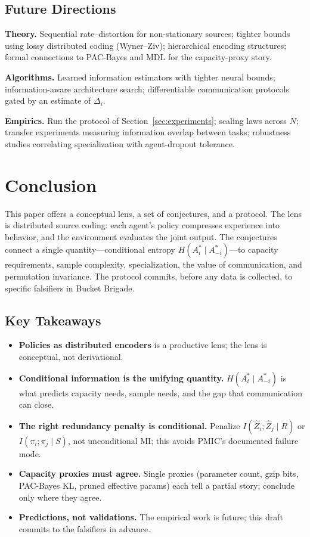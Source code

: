 \documentclass[10pt, letterpaper]{article}
\begin{document}
\subsection{Future Directions}

\textbf{Theory.} Sequential rate--distortion for non-stationary sources; tighter bounds using lossy distributed coding (Wyner--Ziv); hierarchical encoding structures; formal connections to PAC-Bayes and MDL for the capacity-proxy story.

\textbf{Algorithms.} Learned information estimators with tighter neural bounds; information-aware architecture search; differentiable communication protocols gated by an estimate of $\Delta_i$.

\textbf{Empirics.} Run the protocol of Section~\ref{sec:experiments}; scaling laws across $N$; transfer experiments measuring information overlap between tasks; robustness studies correlating specialization with agent-dropout tolerance.

\section{Conclusion}
\label{sec:conclusion}

This paper offers a conceptual lens, a set of conjectures, and a protocol. The lens is distributed source coding: each agent's policy compresses experience into behavior, and the environment evaluates the joint output. The conjectures connect a single quantity---conditional entropy $H(A_i^*\mid A_{-i}^*)$---to capacity requirements, sample complexity, specialization, the value of communication, and permutation invariance. The protocol commits, before any data is collected, to specific falsifiers in Bucket Brigade.

\subsection*{Key Takeaways}
\begin{itemize}
    \item \textbf{Policies as distributed encoders} is a productive lens; the lens is conceptual, not derivational.
    \item \textbf{Conditional information is the unifying quantity.} $H(A_i^*\mid A_{-i}^*)$ is what predicts capacity needs, sample needs, and the gap that communication can close.
    \item \textbf{The right redundancy penalty is conditional.} Penalize $I(\hat{Z}_i; \hat{Z}_j \mid R)$ or $I(\pi_i; \pi_j \mid S)$, not unconditional MI; this avoids PMIC's documented failure mode.
    \item \textbf{Capacity proxies must agree.} Single proxies (parameter count, gzip bits, PAC-Bayes KL, pruned effective params) each tell a partial story; conclude only where they agree.
    \item \textbf{Predictions, not validations.} The empirical work is future; this draft commits to the falsifiers in advance.
\end{itemize}
\end{document}
